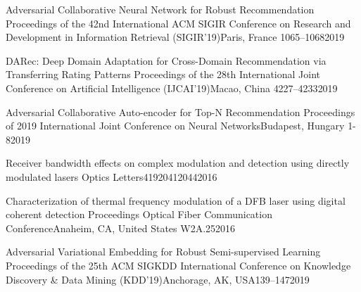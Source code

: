 


\begin{cvpubs}[fontsize=12pt, series=papers]

    {Adversarial Collaborative Neural Network for Robust Recommendation}%
    {Proceedings of the 42nd International ACM SIGIR Conference on Research and Development in Information Retrieval (SIGIR’19)}{Paris, France}{}%
    {1065–1068}{}{2019}

    {DARec: Deep Domain Adaptation for Cross-Domain Recommendation via Transferring Rating Patterns}%
    {Proceedings of the 28th International Joint Conference on Artificial Intelligence (IJCAI'19)}{Macao, China}%
    {}{4227--4233}{}{2019}

    {Adversarial Collaborative Auto-encoder for Top-N Recommendation}%
    {Proceedings of 2019 International Joint Conference on Neural Networks}{Budapest, Hungary}{}%
    {1-8}{}{2019}

    {Receiver bandwidth effects on complex modulation and detection using directly modulated lasers}%
    {Optics Letters}{41}{9}{2041}{2044}{2016}

    {Characterization of thermal frequency modulation of a DFB laser using digital coherent detection}%
    {Proceedings Optical Fiber Communication Conference}{Anaheim, CA, United States}{}%
    {W2A.25}{}{2016}

    {Adversarial Variational Embedding for Robust Semi-supervised Learning}%
    {Proceedings of the 25th ACM SIGKDD International Conference on Knowledge Discovery \& Data Mining (KDD'19)}{Anchorage, AK, USA}{}{139–147}{}{2019}


\end{cvpubs}
